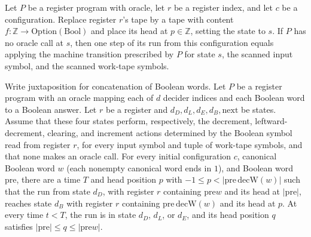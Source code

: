 \begin{lemma}
\label{Complexity.LogProg.rrun_one_reg}
\leanok
{}
Let $P$ be a register program with oracle, let $r$ be a register index, and let $c$ be a
configuration. Replace register $r$'s tape by a tape with content $f:\mathbb
Z\to\mathrm{Option}(\mathrm{Bool})$ and place its head at $p\in\mathbb Z$, setting the
state to $s$. If $P$ has no oracle call at $s$, then one step of its run from this
configuration equals applying the machine transition prescribed by $P$ for state $s$,
the scanned input symbol, and the scanned work-tape symbols.
\end{lemma}

\begin{lemma}
\label{Complexity.LogProg.decD_run}
\leanok
{}
Write juxtaposition for concatenation of Boolean words. Let $P$ be a register program with an oracle mapping each of $d$ decider indices and each Boolean word to a Boolean answer. Let $r$ be a register and $d_D,d_L,d_E,d_B,\mathrm{next}$ be states. Assume that these four states perform, respectively, the decrement, leftward-decrement, clearing, and increment actions determined by the Boolean symbol read from register $r$, for every input symbol and tuple of work-tape symbols, and that none makes an oracle call. For every initial configuration $c$, canonical Boolean word $w$ (each nonempty canonical word ends in $1$), and Boolean word $\mathrm{pre}$, there are a time $T$ and head position $p$ with $-1\le p<|\mathrm{pre}\,\mathrm{decW}(w)|$ such that the run from state $d_D$, with register $r$ containing $\mathrm{pre}w$ and its head at $|\mathrm{pre}|$, reaches state $d_B$ with register $r$ containing $\mathrm{pre}\,\mathrm{decW}(w)$ and its head at $p$. At every time $t<T$, the run is in state $d_D$, $d_L$, or $d_E$, and its head position $q$ satisfies $|\mathrm{pre}|\le q\le|\mathrm{pre}w|$.
\end{lemma}

